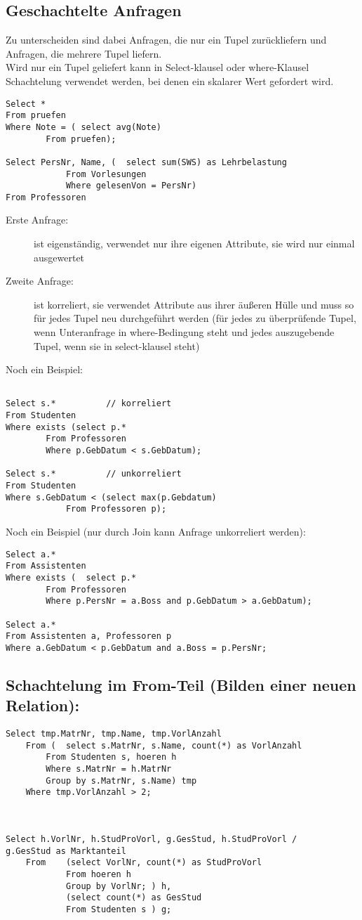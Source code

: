 \subsection{Geschachtelte Anfragen}
Zu unterscheiden sind dabei Anfragen, die nur ein Tupel zurückliefern und Anfragen, die mehrere Tupel liefern. \\Wird nur ein Tupel geliefert kann in Select-klausel oder where-Klausel Schachtelung verwendet werden, bei denen ein skalarer Wert gefordert wird.\\
\begin{lstlisting}
Select *
From pruefen
Where Note = ( select avg(Note)
		From pruefen);

Select PersNr, Name, (	select sum(SWS) as Lehrbelastung
			From Vorlesungen
			Where gelesenVon = PersNr)
From Professoren
\end{lstlisting}
\begin{description}
\item[Erste Anfrage:] ist eigenständig, verwendet nur ihre eigenen Attribute, sie wird nur einmal ausgewertet
\item[Zweite Anfrage:] ist korreliert, sie verwendet Attribute aus ihrer äußeren Hülle und muss so für jedes Tupel neu durchgeführt werden (für jedes zu überprüfende Tupel, wenn Unteranfrage in where-Bedingung steht und jedes auszugebende Tupel, wenn sie in select-klausel steht)
\end{description}

Noch ein Beispiel:
\begin{lstlisting}

Select s.*			// korreliert
From Studenten
Where exists (select p.*
		From Professoren
		Where p.GebDatum < s.GebDatum);

Select s.*			// unkorreliert
From Studenten
Where s.GebDatum < (select max(p.Gebdatum)
			From Professoren p);
\end{lstlisting}
Noch ein Beispiel (nur durch Join kann Anfrage unkorreliert werden):
\begin{lstlisting}
Select a.*
From Assistenten
Where exists (	select p.*
		From Professoren
		Where p.PersNr = a.Boss and p.GebDatum > a.GebDatum);

Select a.*
From Assistenten a, Professoren p
Where a.GebDatum < p.GebDatum and a.Boss = p.PersNr;
\end{lstlisting}
\subsection{Schachtelung im From-Teil (Bilden einer neuen Relation):}
\begin{lstlisting}
Select tmp.MatrNr, tmp.Name, tmp.VorlAnzahl
	From (	select s.MatrNr, s.Name, count(*) as VorlAnzahl
		From Studenten s, hoeren h
		Where s.MatrNr = h.MatrNr
		Group by s.MatrNr, s.Name) tmp
	Where tmp.VorlAnzahl > 2;



Select h.VorlNr, h.StudProVorl, g.GesStud, h.StudProVorl / 
g.GesStud as Marktanteil
	From 	(select VorlNr, count(*) as StudProVorl
			From hoeren h
			Group by VorlNr; ) h,
		    (select count(*) as GesStud
			From Studenten s ) g;
\end{lstlisting}
\newpage
